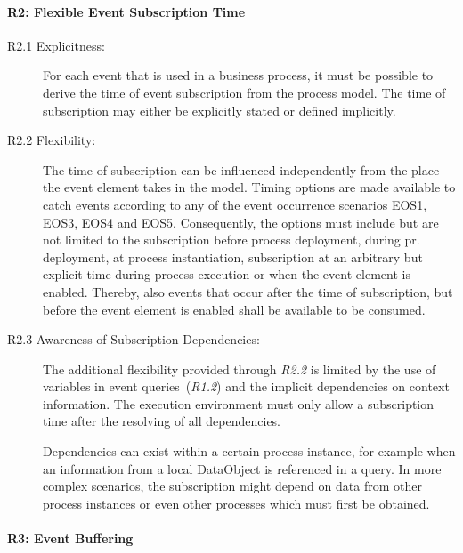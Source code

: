 \paragraph{R2: Flexible Event Subscription Time}

\begin{description}
	\item[R2.1 Explicitness:] 
	For each event that is used in a business process, it must be possible to derive the time of event subscription from the process model. The time of subscription may either be explicitly stated or defined implicitly.
	\item[R2.2 Flexibility:] 
	The time of subscription can be influenced independently from the place the event element takes in the model. Timing options are made available to catch events according to any of the event occurrence scenarios EOS1, EOS3, EOS4 and EOS5. 
	Consequently, the options must include but are not limited to the subscription before process deployment, during  pr. deployment, at process instantiation, subscription at an arbitrary but explicit time during process execution or when the event element is enabled.
	Thereby, also events that occur after the time of subscription, but before the event element is enabled shall be available to be consumed.
	\item[R2.3 Awareness of Subscription Dependencies:]
	The additional flexibility provided through \textit{R2.2} is limited by the use of variables in event queries~(\textit{R1.2}) and the implicit dependencies on context information.
	The execution environment must only allow a subscription time after the resolving of all dependencies.
	
	Dependencies can exist within a certain process instance, for example when an information from a local DataObject is referenced in a query. In more complex scenarios, the subscription might depend on data from other process instances or even other processes which must first be obtained.
\end{description}


\paragraph{R3: Event Buffering}

